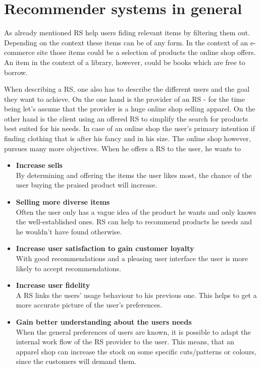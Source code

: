 

\section{Recommender systems in general}
As already mentioned RS help users fiding relevant items by filtering them out.
Depending on the context these items can be of any form.
In the context of an e-commerce site those items could be a selection of products the online shop offers.
An item in the context of a library, however, could be books which are free to borrow.
\citep[p.~377-378]{burke:2007}

When describing a RS, one also has to describe the different users and the goal they want to achieve.
On the one hand is the provider of an RS - for the time being let's assume that the provider is a huge online shop selling apparel.
On the other hand is the client using an offered RS to simplify the search for products best suited for his needs.
In case of an online shop the user's primary intention if finding clothing that is after his fancy and in his size.
The online shop however, pursues many more objectives.
When he offers a RS to the user, he wants to
\begin{itemize}
    \item\textbf{Increase sells}\hfill\\
        By determining and offering the items the user likes most, the chance of the user buying the praised product will increase.
    \item\textbf{Selling more diverse items}\hfill\\
        Often the user only has a vague idea of the product he wants and only knows the well-established ones.
        RS can help to recommend products he needs and he wouldn't have found otherwise.
    \item\textbf{Increase user satisfaction to gain customer loyalty}\hfill\\
        With good recommendations and a pleasing user interface the user is more likely to accept recommendations.
    \item\textbf{Increase user fidelity}\hfill\\
        A RS links the users' usage behaviour to his previous one.
        This helps to get a more accurate picture of the user's preferences.
    \item\textbf{Gain better understanding about the users needs}\hfill\\
        When the general preferences of users are known, it is possible to adapt the internal work flow of the RS provider to the user.
        This means, that an apparel shop can increase the stock on some specific cuts/patterns or colours, since the customers will demand them.
\end{itemize}
